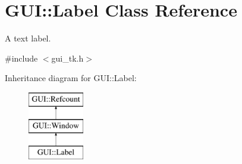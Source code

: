 \hypertarget{classGUI_1_1Label}{\section{G\-U\-I\-:\-:Label Class Reference}
\label{classGUI_1_1Label}
}


A text label.  




{\ttfamily \#include $<$gui\-\_\-tk.\-h$>$}

Inheritance diagram for G\-U\-I\-:\-:Label\-:\begin{figure}[H]
\begin{center}
\leavevmode
\includegraphics[height=3.000000cm]{classGUI_1_1Label}
\end{center}
\end{figure}
